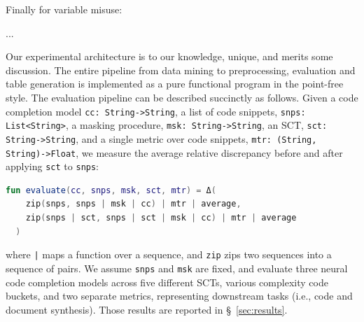 \documentclass[usenames,dvipsnames]{article} %
\begin{document}
  Finally for variable misuse:

  ...


  Our experimental architecture is to our knowledge, unique, and merits some discussion. The entire pipeline from data mining to preprocessing, evaluation and table generation is implemented as a pure functional program in the point-free style. The evaluation pipeline can be described succinctly as follows. Given a code completion model \lstinline|cc: String->String|, a list of code snippets, \lstinline|snps: List<String>|, a masking procedure, \lstinline|msk: String->String|, an SCT, \lstinline|sct: String->String|, and a single metric over code snippets, \lstinline|mtr: (String, String)->Float|, we measure the average relative discrepancy before and after applying \lstinline|sct| to \lstinline|snps|:

  \noindent\begin{lstlisting}[basicstyle=\footnotesize\ttfamily, language=kotlin,label={lst:lstlisting}]
  fun evaluate(cc, snps, msk, sct, mtr) = Δ(
    zip(snps, snps | msk | cc) | mtr | average,
    zip(snps | sct, snps | sct | msk | cc) | mtr | average
  )
  \end{lstlisting}

  \noindent where \texttt{|} maps a function over a sequence, and \lstinline|zip| zips two sequences into a sequence of pairs. We assume \lstinline|snps| and \lstinline|msk| are fixed, and evaluate three neural code completion models across five different SCTs, various complexity code buckets, and two separate metrics, representing downstream tasks (i.e., code and document synthesis). Those results are reported in \S~\ref{sec:results}.
\end{document}
